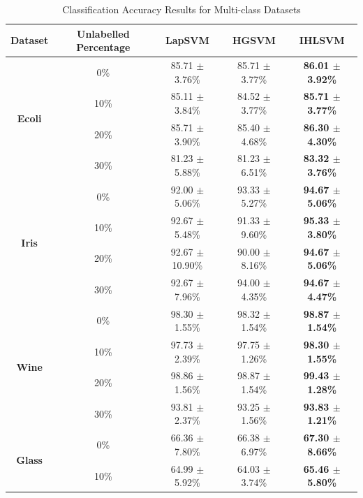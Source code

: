 \documentclass[12pt,a4paper,oneside,english]{report}
\renewcommand{\tabcolsep}{0.5cm}
\renewcommand{\arraystretch}{1.5}
\begin{document}
\begin{table}[!ht]
    \caption{Classification Accuracy Results for Multi-class Datasets}
    \centering
    \setlength\tabcolsep{8pt} %
    \renewcommand{\arraystretch}{1.2} %
    \begin{tabular*}{\linewidth}{@{\extracolsep{\fill}}|c|c|c|c|c|}
        \hline
        \textbf{Dataset} & \textbf{Unlabelled Percentage} & \textbf{LapSVM} & \textbf{HGSVM} & \textbf{IHLSVM} \\
        \hline
        \multirow{4}{*}{\textbf{Ecoli}} 
        & 0\%  & 85.71 $\pm$ 3.76\% & 85.71 $\pm$ 3.77\% & \textbf{86.01 $\pm$ 3.92\%} \\ 
        & 10\% & 85.11 $\pm$ 3.84\% & 84.52 $\pm$ 3.77\% & \textbf{85.71 $\pm$ 3.77\%} \\ 
        & 20\% & 85.71 $\pm$ 3.90\% & 85.40 $\pm$ 4.68\% & \textbf{86.30 $\pm$ 4.30\%} \\ 
        & 30\% & 81.23 $\pm$ 5.88\% & 81.23 $\pm$ 6.51\% & \textbf{83.32 $\pm$ 3.76\%} \\ 
        \hline
        \multirow{4}{*}{\textbf{Iris}} 
        & 0\%  & 92.00 $\pm$ 5.06\% & 93.33 $\pm$ 5.27\% & \textbf{94.67 $\pm$ 5.06\%} \\ 
        & 10\% & 92.67 $\pm$ 5.48\% & 91.33 $\pm$ 9.60\% & \textbf{95.33 $\pm$ 3.80\%} \\ 
        & 20\% & 92.67 $\pm$ 10.90\% & 90.00 $\pm$ 8.16\% & \textbf{94.67 $\pm$ 5.06\%} \\ 
        & 30\% & 92.67 $\pm$ 7.96\% & 94.00 $\pm$ 4.35\% & \textbf{94.67 $\pm$ 4.47\%} \\ 
        \hline
        \multirow{4}{*}{\textbf{Wine}} 
        & 0\%  & 98.30 $\pm$ 1.55\% & 98.32 $\pm$ 1.54\% & \textbf{98.87 $\pm$ 1.54\%} \\ 
        & 10\% & 97.73 $\pm$ 2.39\% & 97.75 $\pm$ 1.26\% & \textbf{98.30 $\pm$ 1.55\%} \\ 
        & 20\% & 98.86 $\pm$ 1.56\% & 98.87 $\pm$ 1.54\% & \textbf{99.43 $\pm$ 1.28\%} \\ 
        & 30\% & 93.81 $\pm$ 2.37\% & 93.25 $\pm$ 1.56\% & \textbf{93.83 $\pm$ 1.21\%} \\ 
        \hline
        \multirow{4}{*}{\textbf{Glass}} 
        & 0\%  & 66.36 $\pm$ 7.80\% & 66.38 $\pm$ 6.97\% & \textbf{67.30 $\pm$ 8.66\%} \\ 
        & 10\% & 64.99 $\pm$ 5.92\% & 64.03 $\pm$ 3.74\% & \textbf{65.46 $\pm$ 5.80\%} \\ 

\end{tabular*}
\end{table}
\end{document}
